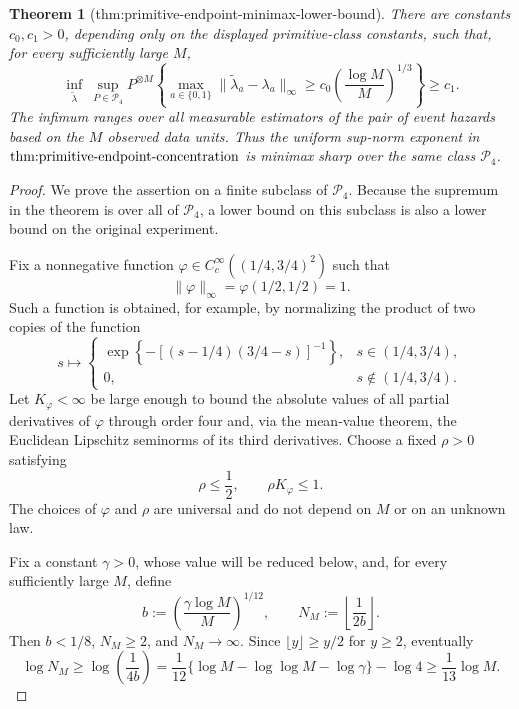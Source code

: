 \documentclass{article}
\newtheorem{theorem}{Theorem}
\begin{document}
\begin{theorem}[thm:primitive-endpoint-minimax-lower-bound]\label{thm:primitive-endpoint-minimax-lower-bound}
There are constants \(c_0,c_1>0\), depending only on the displayed primitive-class constants, such that, for every sufficiently large \(M\),
\[
\inf_{\widetilde\lambda}\ \sup_{P\in\mathcal P_4}
P^{\otimes M}\!\left\{
\max_{a\in\{0,1\}}\lVert\widetilde\lambda_a-\lambda_a\rVert_\infty
\ge c_0\left(\frac{\log M}{M}\right)^{1/3}
\right\}\ge c_1.
\]
The infimum ranges over all measurable estimators of the pair of event hazards based on the \(M\) observed data units. Thus the uniform sup-norm exponent in \(\textnormal{thm:primitive-endpoint-concentration}\) is minimax sharp over the same class \(\mathcal P_4\).
\end{theorem}
\begin{proof}
We prove the assertion on a finite subclass of \(\mathcal P_4\).  Because the supremum in the theorem is over all of \(\mathcal P_4\), a lower bound on this subclass is also a lower bound on the original experiment.

Fix a nonnegative function \(\varphi\in C_c^\infty((1/4,3/4)^2)\) such that
\[
 \lVert\varphi\rVert_\infty=\varphi(1/2,1/2)=1.
\]
Such a function is obtained, for example, by normalizing the product of two copies of the function
\[
 s\longmapsto
 \begin{cases}
 \exp\!\left\{-[(s-1/4)(3/4-s)]^{-1}\right\},&s\in(1/4,3/4),\\
 0,&s\notin(1/4,3/4).
 \end{cases}
\]
Let \(K_\varphi<\infty\) be large enough to bound the absolute values of all partial derivatives of \(\varphi\) through order four and, via the mean-value theorem, the Euclidean Lipschitz seminorms of its third derivatives.  Choose a fixed \(\rho>0\) satisfying
\[
 \rho\le\frac12,
 \qquad
 \rho K_\varphi\le1.                                      \tag{1}
\]
The choices of \(\varphi\) and \(\rho\) are universal and do not depend on \(M\) or on an unknown law.

Fix a constant \(\gamma>0\), whose value will be reduced below, and, for every sufficiently large \(M\), define
\[
 b:=\left(\frac{\gamma\log M}{M}\right)^{1/12},
 \qquad
 N_M:=\left\lfloor\frac{1}{2b}\right\rfloor .             \tag{2}
\]
Then \(b<1/8\), \(N_M\ge2\), and \(N_M\to\infty\).  Since \(\lfloor y\rfloor\ge y/2\) for \(y\ge2\), eventually
\[
 \log N_M
 \ge \log\!\left(\frac{1}{4b}\right)
 =\frac1{12}\{\log M-\log\log M-\log\gamma\}-\log4
 \ge\frac1{13}\log M.                                    \tag{3}
\]


\end{proof}
\end{document}
